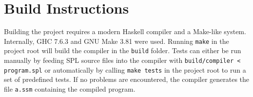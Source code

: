 \documentclass[a4paper]{article}
\begin{document}

\section{Build Instructions}

Building the project requires a modern Haskell compiler and a Make-like system.
Internally, GHC 7.6.3 and GNU Make 3.81 were used.
Running \verb|make| in the project root will build the compiler in the \verb|build| folder.
Tests can either be run manually by feeding SPL source files into the compiler with \verb|build/compiler < program.spl| or automatically by calling \verb|make tests| in the project root to run a set of predefined tests.
If no problems are encountered, the compiler generates the file \verb|a.ssm| containing the compiled program.
\end{document}
